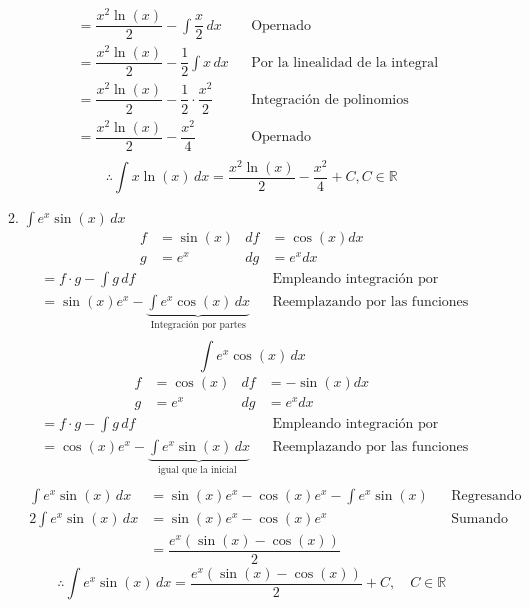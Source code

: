 \documentclass[letterpaper]{article}
\newcommand{\R}{\mathds{R}}
\renewcommand{\*}{\cdot}
\theoremstyle{definition}
\begin{document}
\begin{enumerate}
\begin{enumerate}
\begin{align*}
		&= \dfrac{x^2\ln(x)}{2} - \int \dfrac{x}{2}\,dx && \text{Opernado}\\
		&= \dfrac{x^2\ln(x)}{2} - \dfrac{1}{2}\int x\,dx && \text{Por la linealidad de la integral}\\
		&= \dfrac{x^2\ln(x)}{2} - \dfrac{1}{2}\* \dfrac{x^2}{2}&& \text{Integración de polinomios}\\
		&= \dfrac{x^2\ln(x)}{2} - \dfrac{x^2}{4}&& \text{Opernado}\\
	\end{align*}
	\[ \therefore \int x \ln(x) \, dx =  \dfrac{x^2\ln(x)}{2} - \dfrac{x^2}{4} + C, C \in \R \]
	
	\item$\displaystyle \int e^{x} \sin(x) \, dx$
	\begin{align*}
		f &= \sin(x) & df &=\cos(x)dx \\
		g &= e^x & dg &= e^xdx
	\end{align*}
	\begin{align*}
	&= f \* g - \int g\,df &&\text{Empleando integración por partes}\\
	&= \sin(x)e^x - \underbrace{\int e^x\cos(x)\,dx}_\text{Integración por partes} && \text{Reemplazando por las funciones seleccionadas}\\
	\end{align*}
	\[\int e^x\cos(x)\,dx \]
	\begin{align*}
		f &= \cos(x) & df &=-\sin(x)dx \\
		g &= e^x & dg &= e^xdx
	\end{align*}
	\begin{align*}
		&= f \* g - \int g\,df &&\text{Empleando integración por partes}\\
		&= \cos(x)e^x - \underbrace{\int e^x\sin(x)\,dx}_\text{igual que la inicial
		} && \text{Reemplazando por las funciones seleccionadas}\\
	\end{align*}
	\begin{align*}
		 \int e^{x} \sin(x) \, dx &= \sin(x)e^x - \cos(x)e^x - \int e^x\sin(x) &&\text{Regresando a la integral incial}\\
		2\int e^{x} \sin(x) \, dx &= \sin(x)e^x - \cos(x)e^x &&\text{Sumando en ambos miembros}\\
		&= \dfrac{e^x(\sin(x) - \cos(x))}{2}
	\end{align*}
	\[ \therefore  \int e^{x} \sin(x) \, dx = \dfrac{e^x(\sin(x) - \cos(x))}{2} + C, \quad C \in \R  \]
\end{enumerate}


\end{enumerate}
\end{document}
